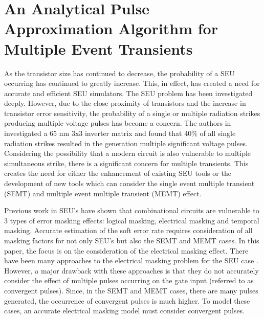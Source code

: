 
\chapter{An Analytical Pulse Approximation Algorithm for Multiple Event Transients} \label{ch2}

As the transistor size has continued to decrease, the probability of a SEU occurring has continued to greatly increase. This, in effect, has created a need for accurate and efficient SEU simulators. The SEU problem has been investigated deeply. \cite{MARS_C,SERA,FASER} However, due to the close proximity of transistors and the increase in transistor error sensitivity, the probability of a single or multiple radiation strikes producing multiple voltage pulses has become a concern. The authors in \cite{Harada} investigated a 65 nm 3x3 inverter matrix and found that 40\% of all single radiation strikes resulted in the generation multiple significant voltage pulses. Considering the possibility that a modern circuit is also vulnerable to multiple simultaneous strike, there is a significant concern for multiple transients. This creates the need for either the enhancement of existing SEU tools or the development of new tools which can consider the single event multiple transient (SEMT) and multiple event multiple transient (MEMT) effect.

Previous work in SEU’s have shown that combinational circuits are vulnerable to 3 types of error masking effects: logical masking, electrical masking and temporal masking. Accurate estimation of the soft error rate requires consideration of all masking factors for not only SEU’s but also the SEMT and MEMT cases. In this paper, the focus is on the consideration of the electrical masking effect. There have been many approaches to the electrical masking problem for the SEU case \cite{Omana_Trap,Accurate_Masking,Weibull}. However, a major drawback with these approaches is that they do not accurately consider the effect of multiple pulses occurring on the gate input (referred to as convergent pulses). Since, in the SEMT and MEMT cases, there are many pulses generated, the occurrence of convergent pulses is much higher. To model these cases, an accurate electrical masking model must consider convergent pulses. 
%


